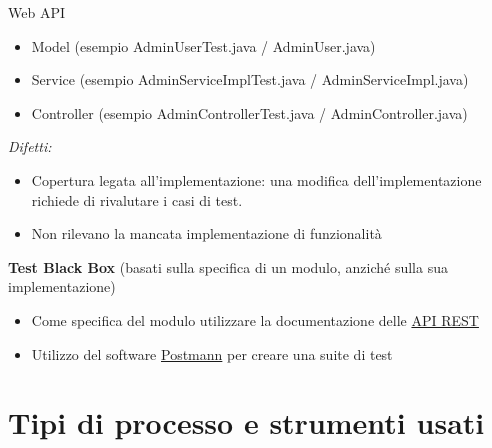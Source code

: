 \documentclass[10pt]{beamer}
\begin{document}
\begin{frame}[allowframebreaks]{Web API}
\begin{itemize}
		\item
		Model (esempio AdminUserTest.java / AdminUser.java)

		\item
		Service (esempio AdminServiceImplTest.java / AdminServiceImpl.java)

		\item
		Controller (esempio AdminControllerTest.java / AdminController.java)

	\end{itemize}

	\emph{Difetti:}
	\begin{itemize}
	
		\item
		Copertura legata all’implementazione: una modifica dell’implementazione richiede di rivalutare i casi di test.
		
		\item
		Non rilevano la mancata implementazione di funzionalità

	\end{itemize}

	\textbf{Test Black Box} (basati sulla specifica di un modulo, anziché sulla sua implementazione)
	\begin{itemize}
		
		\item
		Come specifica del modulo utilizzare la documentazione delle \href{http://localhost:8080/swagger-ui.html}{API REST}

		\item
		Utilizzo del software \href{https://www.postman.com/}{Postmann} per creare una suite di test

	\end{itemize}

\end{frame}

\section{Tipi di processo e strumenti usati }
\end{document}
